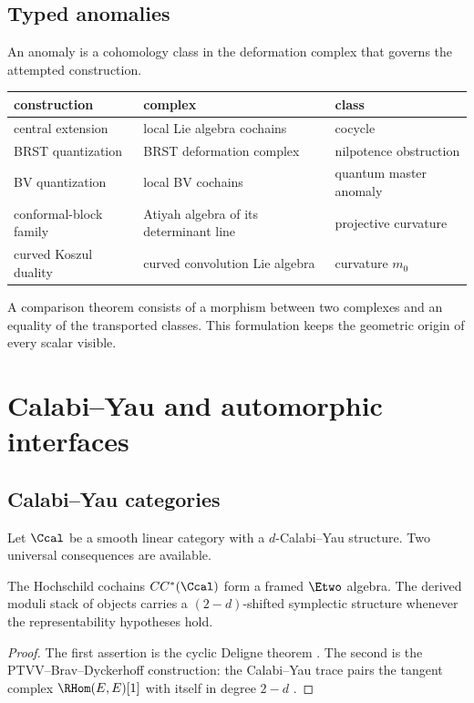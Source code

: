 \chapter{Typed anomalies}
An anomaly is a cohomology class in the deformation complex that governs the attempted construction.
\begin{center}
\begin{tabularx}{\textwidth}{@{}>{\raggedright\arraybackslash}p{}>{\raggedright\arraybackslash}X>{\raggedright\arraybackslash}p{}@{}}
\toprule
construction&complex&class\\ \midrule
central extension&local Lie algebra cochains&cocycle\\
BRST quantization&BRST deformation complex&nilpotence obstruction\\
BV quantization&local BV cochains&quantum master anomaly\\
conformal-block family&Atiyah algebra of its determinant line&projective curvature\\
curved Koszul duality&curved convolution Lie algebra&curvature $m_0$\\
\bottomrule
\end{tabularx}
\end{center}
A comparison theorem consists of a morphism between two complexes and an equality of the transported classes. This formulation keeps the geometric origin of every scalar visible.

\part{Calabi--Yau and automorphic interfaces}

\chapter{Calabi--Yau categories}
Let $\Ccal$ be a smooth linear category with a $d$-Calabi--Yau structure. Two universal consequences are available.

\begin{theorem}
The Hochschild cochains $CC^*(\Ccal)$ form a framed $\Etwo$ algebra. The derived moduli stack of objects carries a $(2-d)$-shifted symplectic structure whenever the representability hypotheses hold.
\end{theorem}
\begin{proof}
The first assertion is the cyclic Deligne theorem \cite{BravRozenblyum}. The second is the PTVV--Brav--Dyckerhoff construction: the Calabi--Yau trace pairs the tangent complex $\RHom(E,E)[1]$ with itself in degree $2-d$ \cite{PTVV,BravDyckerhoff}.
\end{proof}

